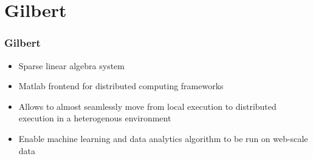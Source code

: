 \section{Gilbert}

\begin{frame}
	\frametitle{Gilbert}
	\begin{itemize}
		\item Sparse linear algebra system
		\item Matlab frontend for distributed computing frameworks
		\item Allows to almost seamlessly move from local execution to distributed execution in a heterogenous environment
		\item Enable machine learning and data analytics algorithm to be run on web-scale data 
	\end{itemize}
\end{frame}